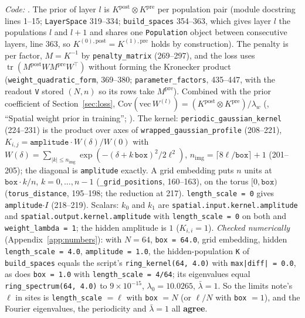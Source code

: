 \documentclass[11pt,a4paper]{article}
\newcommand{\tr}{\operatorname{tr}}
\newcommand{\code}[1]{\texttt{#1}}
\newcommand{\agree}{\textbf{agree}}
\begin{document}
\emph{Code:} . The prior of layer $l$ is $K^{\mathrm{post}}\otimes K^{\mathrm{pre}}$ per population pair (module docstring lines 1--15; \code{LayerSpace} 319--334; \code{build\_spaces} 354--363, which gives layer $l$ the populations $l$ and $l + 1$ and shares one \code{Population} object between consecutive layers, line 363, so $K^{(0),\mathrm{post}} = K^{(1),\mathrm{pre}}$ holds by construction). The penalty is per factor, $M = K^{-1}$ by \code{penalty\_matrix} (269--297), and the loss uses $\tr(M^{\mathrm{post}}WM^{\mathrm{pre}}W^\top)$ without forming the Kronecker product (\code{weight\_quadratic\_form}, 369--380; \code{parameter\_factors}, 435--447, with the readout \code{V} stored $(N, n)$ so its rows take $M^{\mathrm{pre}}$). Combined with the prior coefficient of Section~\ref{sec:loss}, $\mathrm{Cov}(\mathrm{vec}\,W^{(l)}) = (K^{\mathrm{post}}\otimes K^{\mathrm{pre}})/\lambda_w$ (, ``Spatial weight prior in training''; ). The kernel: \code{periodic\_gaussian\_kernel} (224--231) is the product over axes of \code{wrapped\_gaussian\_profile} (208--221), $K_{i,j} = \code{amplitude}\cdot W(\delta)/W(0)$ with $W(\delta) = \sum_{|k|\le n_{\mathrm{img}}}\exp(-(\delta + k\,\code{box})^2/2\ell^2)$, $n_{\mathrm{img}} = \lceil 8\ell/\code{box}\rceil + 1$ (201--205); the diagonal is \code{amplitude} exactly. A grid embedding puts $n$ units at $\code{box}\cdot k/n$, $k = 0,\dots,n-1$ (\code{\_grid\_positions}, 160--163), on the torus $[0,\code{box})$ (\code{torus\_distance}, 195--198; the reduction at 217). \code{length\_scale = 0} gives \code{amplitude}$\cdot I$ (218--219). Scalars: $k_0$ and $k_1$ are \code{spatial.input.kernel.amplitude} and \code{spatial.output.kernel.amplitude} with \code{length\_scale = 0} on both and \code{weight\_lambda = 1}; the hidden amplitude is $1$ ($K_{i,i} = 1$). \emph{Checked numerically} (Appendix~\ref{app:numbers}): with $N = 64$, \code{box = 64.0}, grid embedding, hidden \code{length\_scale = 4.0}, \code{amplitude = 1.0}, the hidden-population \code{K} of \code{build\_spaces} equals the script's \code{ring\_kernel(64, 4.0)} with \code{max|diff| = 0.0}, as does \code{box = 1.0} with \code{length\_scale = 4/64}; its eigenvalues equal \code{ring\_spectrum(64, 4.0)} to $9\times10^{-15}$, $\lambda_0 = 10.0265$, $\bar\lambda = 1$. So the limits note's $\ell$ in sites is \code{length\_scale} $=\ell$ with \code{box} $= N$ (or $\ell/N$ with \code{box} $= 1$), and the Fourier eigenvalues, the periodicity and $\bar\lambda = 1$ all \agree.
\end{document}
